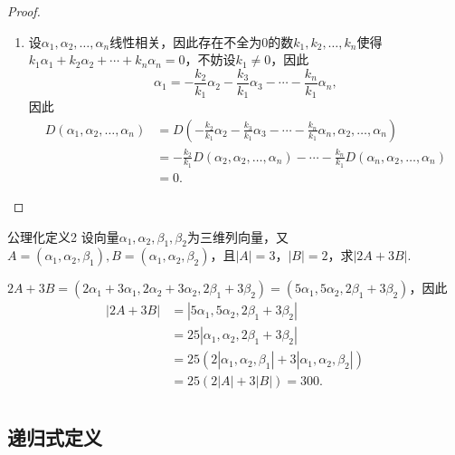 \begin{proof}
\begin{enumerate}
        \item 设$\alpha_1,\alpha_2,\ldots,\alpha_n$线性相关，因此存在不全为0的数$k_1,k_2,\ldots,k_n$使得$k_1\alpha_1+k_2\alpha_2+\cdots+k_n\alpha_n=0$，不妨设$k_1 \neq 0$，因此
              \[\alpha_1=-\frac{k_2}{k_1}\alpha_2-\frac{k_3}{k_1}\alpha_3-\cdots-\frac{k_n}{k_1}\alpha_n,\]
              因此
              \begin{align*}
                  D(\alpha_1,\alpha_2,\ldots,\alpha_n) & =D(-\frac{k_2}{k_1}\alpha_2-\frac{k_3}{k_1}\alpha_3-\cdots-\frac{k_n}{k_1}\alpha_n,\alpha_2,\ldots,\alpha_n)     \\
                                                       & =-\frac{k_2}{k_1}D(\alpha_2,\alpha_2,\ldots,\alpha_n)-\cdots-\frac{k_n}{k_1}D(\alpha_n,\alpha_2,\ldots,\alpha_n) \\
                                                       & =0.
              \end{align*}
    \end{enumerate}
\end{proof}

\begin{example}{}{公理化定义2}
    设向量$\alpha_1,\alpha_2,\beta_1,\beta_2$为三维列向量，又$A=(\alpha_1,\alpha_2,\beta_1),B=(\alpha_1,\alpha_2,\beta_2)$，且$|A|=3$，$|B|=2$，求$|2A+3B|$.
\end{example}

\begin{solution}
    $2A+3B=(2\alpha_1+3\alpha_1,2\alpha_2+3\alpha_2,2\beta_1+3\beta_2)=(5\alpha_1,5\alpha_2,2\beta_1+3\beta_2)$，因此
    \begin{align*}
        |2A+3B| & =|5\alpha_1,5\alpha_2,2\beta_1+3\beta_2|                       \\
                & =25|\alpha_1,\alpha_2,2\beta_1+3\beta_2|                       \\
                & =25(2|\alpha_1,\alpha_2,\beta_1|+3|\alpha_1,\alpha_2,\beta_2|) \\
                & =25(2|A|+3|B|)=300.                                            \\
    \end{align*}
\end{solution}

\subsection{递归式定义}

